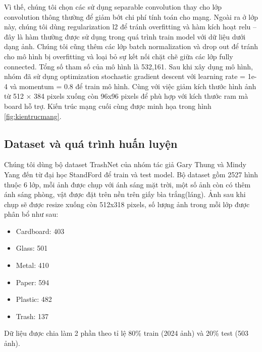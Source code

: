 Vì thế, chúng tôi chọn các sử dụng separable convolution thay cho lớp convolution thông thường để giảm bớt chi phí tính toán cho mạng. Ngoài ra ở lớp này, chúng tôi dùng regularization l2 để tránh overfitting và hàm kích hoạt relu – đây là hàm thường được sử dụng trong quá trình train model với dữ liệu dưới dạng ảnh. Chúng tôi cũng thêm các lớp batch normalization và drop out để tránh cho mô hình bị overfitting và loại bỏ sự kết nối chặt chẽ giữa các lớp fully connected. Tổng số tham số của mô hình là 532,161. Sau khi xây dụng mô hình, nhóm đã sử dụng optimization stochastic gradient descent với learning rate = 1e-4 và momentum = 0.8 để train mô hình. Cùng với việc giảm kích thước hình ảnh từ 512 × 384 pixels xuống còn 96x96 pixels để phù hợp với kích thước ram mà board hỗ trợ. Kiến trúc mạng cuối cùng được minh họa trong hình \ref{fig:kientrucmang}.

\subsection{Dataset và quá trình huấn luyện} %


Chúng tôi dùng bộ dataset TrashNet \cite{trashnet} của nhóm tác giả Gary Thung và Mindy Yang đến từ đại học StandFord để train và test model. Bộ dataset gồm 2527 hình thuộc 6 lớp, mỗi ảnh được chụp với ánh sáng mặt trời, một số ảnh còn có thêm ánh sáng phòng, vật được đặt trên nền trên giấy bìa trắng(láng). Ảnh sau khi chụp sẽ được resize xuống còn 512x318 pixels, số lượng ảnh trong mỗi lớp được phân bổ như sau:
 
\begin{itemize}
    \item Cardboard: 403
    \item Glass: 501
    \item Metal: 410
    \item Paper: 594
    \item Plastic: 482
    \item Trash: 137
\end{itemize}

Dữ liệu được chia làm 2 phần theo tỉ lệ 80\% train (2024 ảnh) và 20\% test (503 ảnh).

